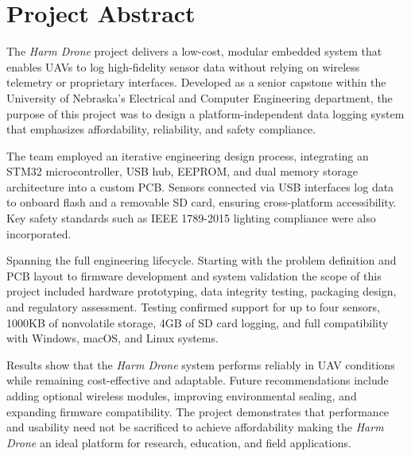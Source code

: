 \documentclass[../main.tex]{subfiles}
\begin{document}
\section*{Project Abstract}

\par The \textit{Harm Drone} project delivers a low-cost, modular embedded system that enables UAVs to log high-fidelity sensor data without relying on wireless telemetry or proprietary interfaces. Developed as a senior capstone within the University of Nebraska’s Electrical and Computer Engineering department, the purpose of this project was to design a platform-independent data logging system that emphasizes affordability, reliability, and safety compliance.

\par The team employed an iterative engineering design process, integrating an STM32 microcontroller, USB hub, EEPROM, and dual memory storage architecture into a custom PCB. Sensors connected via USB interfaces log data to onboard flash and a removable SD card, ensuring cross-platform accessibility. Key safety standards such as IEEE 1789-2015 lighting compliance were also incorporated.

\par Spanning the full engineering lifecycle. Starting with the problem definition and PCB layout to firmware development and system validation the scope of this project included hardware prototyping, data integrity testing, packaging design, and regulatory assessment. Testing confirmed support for up to four sensors, 1000KB of nonvolatile storage, 4GB of SD card logging, and full compatibility with Windows, macOS, and Linux systems.

\par Results show that the \textit{Harm Drone} system performs reliably in UAV conditions while remaining cost-effective and adaptable. Future recommendations include adding optional wireless modules, improving environmental sealing, and expanding firmware compatibility. The project demonstrates that performance and usability need not be sacrificed to achieve affordability making the \textit{Harm Drone} an ideal platform for research, education, and field applications.
\end{document}
